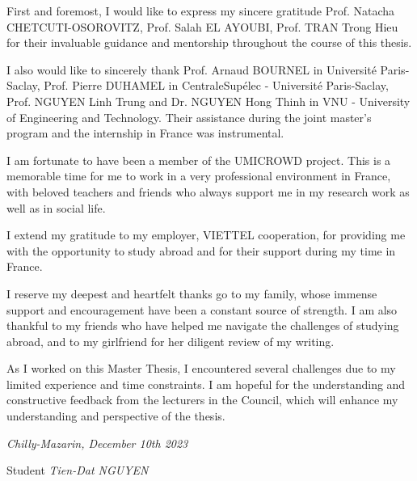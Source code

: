 First and foremost, I would like to express my sincere gratitude
Prof. Natacha CHETCUTI-OSOROVITZ,
Prof. Salah EL AYOUBI,
Prof. TRAN Trong Hieu
for their invaluable guidance and mentorship throughout the course of this thesis.

I also would like to sincerely thank
Prof. Arnaud BOURNEL in Université Paris-Saclay,
Prof. Pierre DUHAMEL in CentraleSupélec - Université Paris-Saclay,
Prof. NGUYEN Linh Trung and Dr. NGUYEN Hong Thinh in VNU - University of Engineering and Technology.
Their assistance during the joint master’s program and the internship in France was instrumental.

I am fortunate to have been a member of the UMICROWD project.
This is a memorable time for me to work in a very professional environment in France, with beloved teachers and friends who always support me in my research work as well as in social life.

I extend my gratitude to my employer, VIETTEL cooperation, for providing me with the opportunity to study abroad and for their support during my time in France.

I reserve my deepest and heartfelt thanks go to my family,
whose immense support and encouragement have been a constant source of strength.
I am also thankful to my friends who have helped me navigate the challenges of studying abroad,
and to my girlfriend for her diligent review of my writing.

As I worked on this Master Thesis, I encountered several challenges due to my limited experience and time constraints. I am hopeful for the understanding and constructive feedback from the lecturers in the Council, which will enhance my understanding and perspective of the thesis.

\begin{flushright}
	\textit{Chilly-Mazarin, December 10th 2023}

	Student
	\textit{Tien-Dat NGUYEN}
\end{flushright}